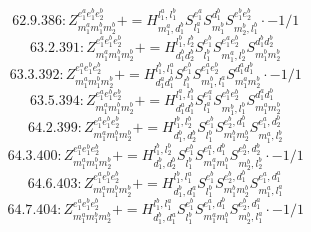 \documentclass[letterpaper,10pt,fleqn,leqno,onecolumn]{article}
\begin{document}
\begin{equation} \;\;\;\;\;\;  62.9.386: Z^{e_{1}^{a}e_{1}^{b}e_{2}^{b}}_{m_{1}^{a}m_{1}^{b}m_{2}^{b}}+=H^{l_{1}^{a},l_{1}^{b}}_{m_{1}^{a},d_{1}^{b}}S^{e_{1}^{a}}_{l_{1}^{a}}S^{d_{1}^{b}}_{m_{1}^{b}}S^{e_{1}^{b}e_{2}^{b}}_{m_{2}^{b},l_{1}^{b}}\cdot -1/1 \end{equation}
\begin{equation} \;\;\;\;\;\;  63.2.391: Z^{e_{1}^{a}e_{1}^{b}e_{2}^{b}}_{m_{1}^{a}m_{1}^{b}m_{2}^{b}}+=H^{l_{1}^{b},l_{2}^{b}}_{d_{1}^{b}d_{2}^{b}}S^{e_{1}^{b}}_{l_{1}^{b}}S^{e_{1}^{a}e_{2}^{b}}_{m_{1}^{a},l_{2}^{b}}S^{d_{1}^{b}d_{2}^{b}}_{m_{1}^{b}m_{2}^{b}} \end{equation}
\begin{equation} \;\;\;\;\;\;  63.3.392: Z^{e_{1}^{a}e_{1}^{b}e_{2}^{b}}_{m_{1}^{a}m_{1}^{b}m_{2}^{b}}+=H^{l_{1}^{b},l_{1}^{a}}_{d_{1}^{a}d_{1}^{b}}S^{e_{1}^{b}}_{l_{1}^{b}}S^{e_{1}^{a}e_{2}^{b}}_{m_{1}^{b},l_{1}^{a}}S^{d_{1}^{a}d_{1}^{b}}_{m_{1}^{a}m_{2}^{b}}\cdot -1/1 \end{equation}
\begin{equation} \;\;\;\;\;\;  63.5.394: Z^{e_{1}^{a}e_{1}^{b}e_{2}^{b}}_{m_{1}^{a}m_{1}^{b}m_{2}^{b}}+=H^{l_{1}^{a},l_{1}^{b}}_{d_{1}^{a}d_{1}^{b}}S^{e_{1}^{a}}_{l_{1}^{a}}S^{e_{1}^{b}e_{2}^{b}}_{m_{1}^{b},l_{1}^{b}}S^{d_{1}^{a}d_{1}^{b}}_{m_{1}^{a}m_{2}^{b}} \end{equation}
\begin{equation} \;\;\;\;\;\;  64.2.399: Z^{e_{1}^{a}e_{1}^{b}e_{2}^{b}}_{m_{1}^{a}m_{1}^{b}m_{2}^{b}}+=H^{l_{1}^{b},l_{2}^{b}}_{d_{1}^{b},d_{2}^{b}}S^{e_{1}^{b}}_{l_{1}^{b}}S^{e_{2}^{b},d_{1}^{b}}_{m_{1}^{b}m_{2}^{b}}S^{e_{1}^{a},d_{2}^{b}}_{m_{1}^{a},l_{2}^{b}} \end{equation}
\begin{equation} \;\;\;\;\;\;  64.3.400: Z^{e_{1}^{a}e_{1}^{b}e_{2}^{b}}_{m_{1}^{a}m_{1}^{b}m_{2}^{b}}+=H^{l_{1}^{b},l_{2}^{b}}_{d_{1}^{b},d_{2}^{b}}S^{e_{1}^{b}}_{l_{1}^{b}}S^{e_{1}^{a},d_{1}^{b}}_{m_{1}^{a}m_{1}^{b}}S^{e_{2}^{b},d_{2}^{b}}_{m_{2}^{b},l_{2}^{b}}\cdot -1/1 \end{equation}
\begin{equation} \;\;\;\;\;\;  64.6.403: Z^{e_{1}^{a}e_{1}^{b}e_{2}^{b}}_{m_{1}^{a}m_{1}^{b}m_{2}^{b}}+=H^{l_{1}^{b},l_{1}^{a}}_{d_{1}^{b},d_{1}^{a}}S^{e_{1}^{b}}_{l_{1}^{b}}S^{e_{2}^{b},d_{1}^{b}}_{m_{1}^{b}m_{2}^{b}}S^{e_{1}^{a},d_{1}^{a}}_{m_{1}^{a},l_{1}^{a}} \end{equation}
\begin{equation} \;\;\;\;\;\;  64.7.404: Z^{e_{1}^{a}e_{1}^{b}e_{2}^{b}}_{m_{1}^{a}m_{1}^{b}m_{2}^{b}}+=H^{l_{1}^{b},l_{1}^{a}}_{d_{1}^{b},d_{1}^{a}}S^{e_{1}^{b}}_{l_{1}^{b}}S^{e_{1}^{a},d_{1}^{b}}_{m_{1}^{a}m_{1}^{b}}S^{e_{2}^{b},d_{1}^{a}}_{m_{2}^{b},l_{1}^{a}}\cdot -1/1 \end{equation}
\end{document}
